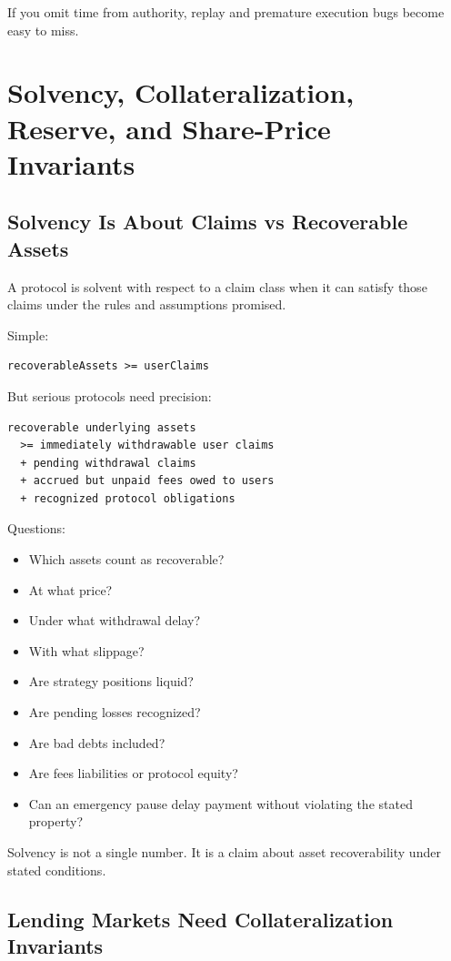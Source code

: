 If you omit time from authority, replay and premature execution bugs
become easy to miss.

\section{Solvency, Collateralization, Reserve, and Share-Price Invariants}

\subsection{Solvency Is About Claims vs Recoverable Assets}

A protocol is solvent with respect to a claim class when it can satisfy
those claims under the rules and assumptions promised.

Simple:

\begin{lstlisting}
recoverableAssets >= userClaims
\end{lstlisting}

But serious protocols need precision:

\begin{lstlisting}
recoverable underlying assets
  >= immediately withdrawable user claims
  + pending withdrawal claims
  + accrued but unpaid fees owed to users
  + recognized protocol obligations
\end{lstlisting}

Questions:

\begin{itemize}
\tightlist
\item
  Which assets count as recoverable?
\item
  At what price?
\item
  Under what withdrawal delay?
\item
  With what slippage?
\item
  Are strategy positions liquid?
\item
  Are pending losses recognized?
\item
  Are bad debts included?
\item
  Are fees liabilities or protocol equity?
\item
  Can an emergency pause delay payment without violating the stated
  property?
\end{itemize}

Solvency is not a single number. It is a claim about asset
recoverability under stated conditions.

\subsection{Lending Markets Need Collateralization Invariants}

